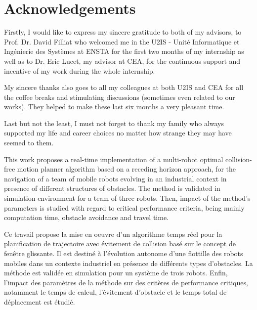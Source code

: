 \documentclass[12pt]{book}
\numberwithin{equation}{section}
\newenvironment{abstractpage}
  {\cleardoublepage\vspace*{\fill}\thispagestyle{empty}}
  {\vfill\cleardoublepage}
\newenvironment{Abstract}[1]
  {\bigskip\selectlanguage{#1}%
   \begin{center}\bfseries\abstractname\end{center}}
  {\par\bigskip}
\begin{document}
\onehalfspace
\frontmatter

\pagestyle{fancy}
\fancyhead{}
\fancyhead[RE,LO]{\leftmark} %
\fancyfoot{}
\fancyfoot[OR,EL]{\thepage}

\let\savecleardoublepage\cleardoublepage
\let\cleardoublepage\clearpage
\chapter*{Acknowledgements}

Firstly, I would like to express my sincere gratitude to both of my advisors, to Prof. Dr. David Filliat who welcomed me in the U2IS - Unité Informatique et Ingénierie des Systèmes at ENSTA for the first two months of my internship as well as to Dr. Eric Lucet, my advisor at CEA, for the continuous support and incentive of my work during the whole internship.

My sincere thanks also goes to all my colleagues at both U2IS and CEA for all the coffee breaks and stimulating discussions (sometimes even related to our works). They helped to make these last six months a very pleasant time.

Last but not the least, I must not forget to thank my family who always supported my life and career choices no matter how strange they may have seemed to them.

\begin{abstractpage}
\thispagestyle{empty}
\begin{Abstract}{english}

This work proposes a real-time implementation of a multi-robot optimal collision-free motion planner algorithm based on a receding horizon approach, for the navigation of a team of mobile robots evolving in an industrial context in presence of different structures of obstacles. The method is validated in simulation environment for a team of three robots. Then, impact of the method's parameters is studied with regard to critical performance criteria, being mainly computation time, obstacle avoidance and travel time.

\end{Abstract}
\begin{Abstract}{french}

Ce travail propose la mise en oeuvre d'un algorithme temps réel pour la planification de trajectoire avec évitement de collision basé sur le concept de fenêtre glissante. Il est destiné à l'évolution autonome d'une flottille des robots mobiles dans un contexte industriel en présence de différents types d'obstacles. La méthode est validée en simulation pour un système de trois robots. Enfin, l'impact des paramètres de la méthode sur des critères de performance critiques, notamment le temps de calcul, l'évitement d'obstacle et le temps total de déplacement est étudié.

\end{Abstract}
\end{abstractpage}
\let\cleardoublepage\savecleardoublepage
\end{document}
